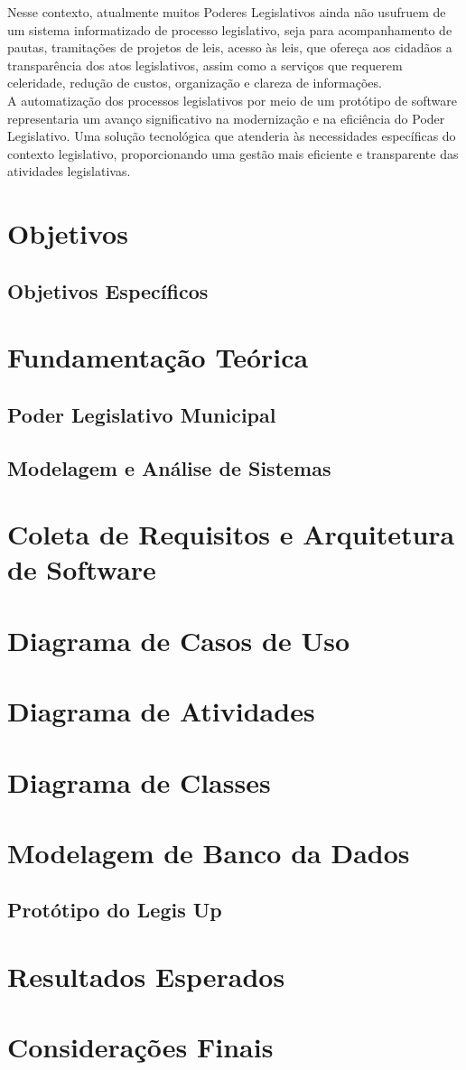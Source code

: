 \documentclass[12pt]{article}
\begin{document}
Nesse contexto, atualmente muitos Poderes Legislativos ainda não usufruem de um sistema informatizado de processo legislativo, seja para acompanhamento de pautas, tramitações de projetos de leis, acesso às leis, que ofereça aos cidadãos a transparência dos atos legislativos, assim como a serviços que requerem celeridade, redução de custos, organização e clareza de informações.\\

A automatização dos processos legislativos por meio de um protótipo de software representaria um avanço significativo na modernização e na eficiência do Poder Legislativo. Uma solução tecnológica que atenderia às necessidades específicas do contexto legislativo, proporcionando uma gestão mais eficiente e transparente das atividades legislativas.


\section{Objetivos}
\subsection{Objetivos Específicos}
\section{Fundamentação Teórica}
\subsection{Poder Legislativo Municipal}
\subsection{Modelagem e Análise de Sistemas}
\section{Coleta de Requisitos e Arquitetura de Software}
\section{Diagrama de Casos de Uso}
\section{Diagrama de Atividades}
\section{Diagrama de Classes}
\section{Modelagem de Banco da Dados}
\subsection{Protótipo do Legis Up}
\section{Resultados Esperados}
\section{Considerações Finais}


\printbibliography
\end{document}

